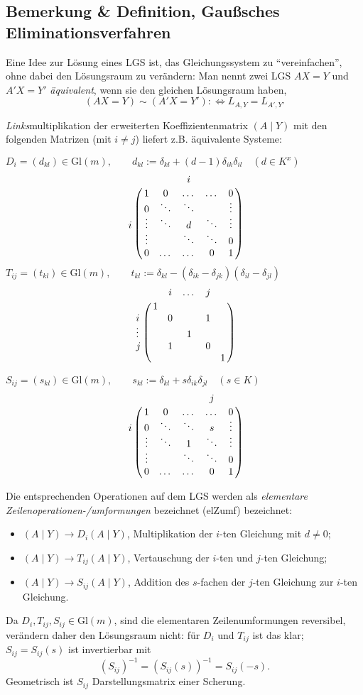  \subsection{Bemerkung \& Definition, Gaußsches Eliminationsverfahren}
 	\begin{Definition}
 		Eine Idee zur Lösung eines LGS ist, das Gleichungssystem zu "`vereinfachen"', ohne dabei den Lösungsraum zu verändern: Man nennt zwei LGS $ AX=Y$ und $A'X=Y' $ \emph{äquivalent}, wenn sie den gleichen Lösungsraum haben,
 		\[
 			(AX=Y)\sim (A'X=Y'):\Leftrightarrow L_{A,Y} = L_{A',Y'}
 		\]
 	\end{Definition}
 	\emph{Links}multiplikation der erweiterten Koeffizientenmatrix $ (A\mid Y) $ mit den folgenden Matrizen (mit $ i\neq j $) liefert z.B. äquivalente Systeme:

 	$ D_i = (d_{kl})\in \mathrm{Gl}(m), \qquad
 	d_{kl} := \delta_{kl}+(d-1)\delta_{ik}\delta_{il}\quad (d\in K^x) $
 	\[
 		\bordermatrix{
 			&   &   & i & &\cr
 			& 1 & 0 & \dots & \dots & 0\cr
 			& 0 & \ddots & \ddots &   & \vdots \cr
 			i & \vdots & \ddots & d & \ddots & \vdots \cr
 			& \vdots &   &  \ddots & \ddots & 0 \cr
 			& 0 &  \dots & \dots  & 0 & 1 \cr
 		}
 	\]
 	$ T_{ij} = (t_{kl})\in \mathrm{Gl}(m), \qquad
 	t_{kl} := \delta_{kl}-(\delta_{ik}-\delta_{jk})(\delta_{il}-\delta_{jl})$
 	\[
 		\bordermatrix{
 			&        & i      & \dots  & j     &         \cr
 			& 1      &        &        &       &         \cr
 			i     &        & 0      &        & 1     &         \cr
 			\vdots&        &        & 1      &       &         \cr
 			j     &        & 1      &        & 0     &         \cr
 			&        &        &        &       & 1       \cr
 		}
 	\]

 	$ S_{ij}=(s_{kl})\in \mathrm{Gl}(m), \qquad
 	s_{kl} := \delta_{kl}+s\delta_{ik}\delta_{jl} \quad (s\in K)$
 	\[
 		\bordermatrix{
 			&   &   &  & j &\cr
 			& 1 & 0 & \dots & \dots & 0\cr
 			i & 0 & \ddots & \ddots & s & \vdots \cr
 			& \vdots & \ddots & 1 & \ddots & \vdots \cr
 			& \vdots &   &  \ddots & \ddots & 0 \cr
 			& 0 &  \dots & \dots  & 0 & 1 \cr
 		}
 	\]

 	Die entsprechenden Operationen auf dem LGS werden als \emph{elementare Zeilenoperationen-/umformungen} bezeichnet (elZumf) bezeichnet:
 	\begin{itemize}
 		\item $ (A\mid Y) \to D_i (A\mid Y) $, Multiplikation der $ i $-ten Gleichung mit $ d\neq 0 $;
 		\item $ (A\mid Y) \to T_{ij} (A\mid Y) $, Vertauschung der $ i $-ten und $ j $-ten Gleichung;
 		\item $ (A\mid Y) \to S_{ij} (A\mid Y)$, Addition des $ s $-fachen der $ j $-ten Gleichung zur $ i $-ten Gleichung.
 	\end{itemize}
 	Da $ D_i,T_{ij},S_{ij}\in \mathrm{Gl}(m) $, sind die elementaren Zeilenumformungen reversibel, verändern daher den Lösungsraum nicht: für $ D_i $ und $ T_{ij} $ ist das klar; $ S_{ij} = S_{ij}(s) $ ist invertierbar mit
 	\[
 		(S_{ij})^{-1} = (S_{ij}(s))^{-1} = S_{ij}(-s).
 	\]
 	Geometrisch ist $ S_{ij} $ Darstellungsmatrix einer Scherung.

